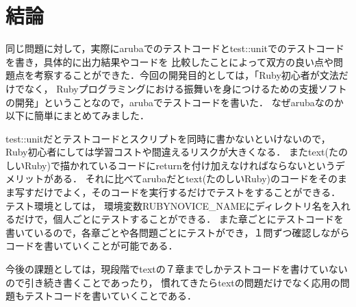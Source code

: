
\section{結論}
同じ問題に対して，実際にarubaでのテストコードとtest::unitでのテストコードを書き，具体的に出力結果やコードを
比較したことによって双方の良い点や問題点を考察することができた．今回の開発目的としては，「Ruby初心者が文法だけでなく，
Rubyプログラミングにおける振舞いを身につけるための支援ソフトの開発」ということなので，arubaでテストコードを書いた．
なぜarubaなのか以下に簡単にまとめてみました．

test::unitだとテストコードとスクリプトを同時に書かないといけないので，Ruby初心者にしては学習コストや間違えるリスクが大きくなる．
またtext(たのしいRuby)で描かれているコードにreturnを付け加えなければならないというデメリットがある．
それに比べてarubaだとtext(たのしいRuby)のコードをそのまま写すだけでよく，そのコードを実行するだけでテストをすることができる．
テスト環境としては， 環境変数RUBYNOVICE\_NAMEにディレクトリ名を入れるだけで，個人ごとにテストすることができる．
また章ごとにテストコードを書いているので，各章ごとや各問題ごとにテストができ，１問ずつ確認しながらコードを書いていくことが可能である．

今後の課題としては，現段階でtextの７章までしかテストコードを書けていないので引き続き書くことであったり，
慣れてきたらtextの問題だけでなく応用の問題もテストコードを書いていくことである．

